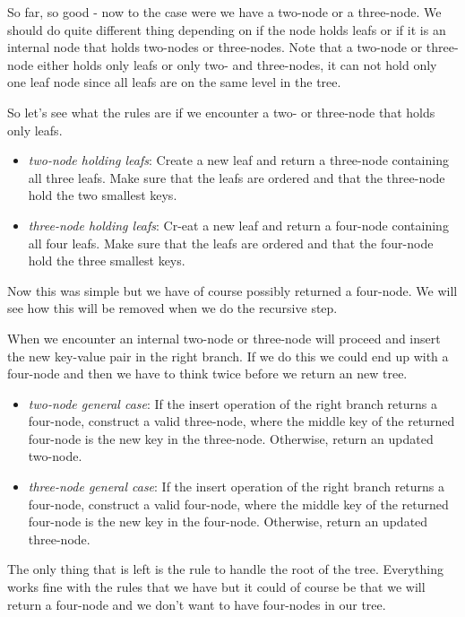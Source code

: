 \documentclass[a4paper,11pt]{article}
\begin{document}
So far, so good - now to the case were we have a two-node or a
three-node. We should do quite different thing depending on if the
node holds leafs or if it is an internal node that holds two-nodes or
three-nodes. Note that a two-node or three-node either holds only
leafs or only two- and three-nodes, it can not hold only one leaf node
since all leafs are on the same level in the tree.

So let's see what the rules are if we encounter a two- or three-node
that holds only leafs.

\begin{itemize}
    \item {\em two-node holding leafs}: Create a new leaf and return a
    three-node containing all three leafs. Make sure that the leafs
    are ordered and that the three-node hold the two smallest keys.
    \item {\em three-node holding leafs}: Cr-eat a new leaf and return a
    four-node containing all four leafs. Make sure that the leafs
    are ordered and that the four-node hold the three smallest keys.     
\end{itemize}

Now this was simple but we have of course possibly returned a
four-node. We will see how this will be removed when we do the
recursive step.

When we encounter an internal two-node or three-node will proceed and
insert the new key-value pair in the right branch. If we do this we
could end up with a four-node and then we have to think twice before
we return an new tree.

\begin{itemize}
    \item {\em two-node general case}: If the insert operation of the right branch returns a four-node, construct a valid three-node, where the middle key of the returned four-node is the new key in the three-node. Otherwise, return an updated two-node.
    \item {\em three-node general case}: If the insert operation of the right branch returns a four-node, construct a valid four-node, where the middle key of the returned four-node is the new key in the four-node. Otherwise, return an updated three-node.
\end{itemize}

The only thing that is left is the rule to handle the root of the
tree. Everything works fine with the rules that we have but it could
of course be that we will return a four-node and we don't want to have
four-nodes in our tree.
\end{document}

